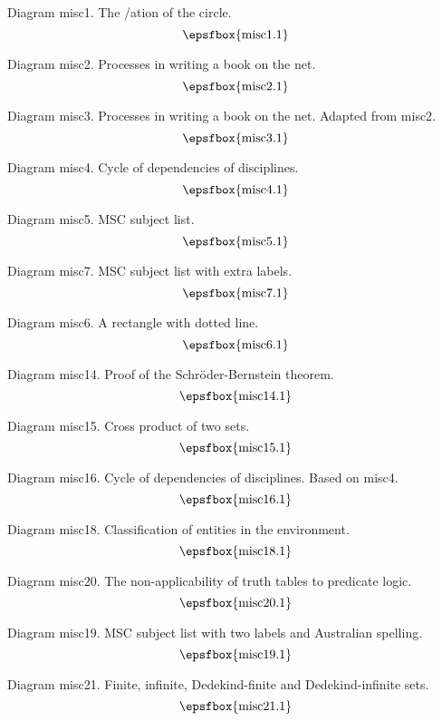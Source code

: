 Diagram misc1. The \parametris/ation of the circle.
$$
\centerline{\epsfbox{misc1.1}}
$$

Diagram misc2. Processes in writing a book on the net.
$$
\centerline{\epsfbox{misc2.1}}
$$

Diagram misc3. Processes in writing a book on the net. Adapted from misc2.
$$
\centerline{\epsfbox{misc3.1}}
$$

Diagram misc4. Cycle of dependencies of disciplines.
$$
\centerline{\epsfbox{misc4.1}}
$$

\filleject

Diagram misc5. MSC subject list.
$$
\centerline{\epsfbox{misc5.1}}
$$

\filleject

Diagram misc7. MSC subject list with extra labels.
$$
\centerline{\epsfbox{misc7.1}}
$$

\filleject

Diagram misc6. A rectangle with dotted line.
$$
\centerline{\epsfbox{misc6.1}}
$$

Diagram misc14. Proof of the Schr\"oder-Bernstein theorem.
$$
\centerline{\epsfbox{misc14.1}}
$$

Diagram misc15. Cross product of two sets.
$$
\centerline{\epsfbox{misc15.1}}
$$

\filleject

Diagram misc16. Cycle of dependencies of disciplines. Based on misc4.
$$
\centerline{\epsfbox{misc16.1}}
$$

Diagram misc18. Classification of entities in the environment.
$$
\centerline{\epsfbox{misc18.1}}
$$

Diagram misc20. The non-applicability of truth tables to predicate logic.
$$
\centerline{\epsfbox{misc20.1}}
$$

\filleject

Diagram misc19. MSC subject list with two labels and Australian
spelling.
$$
\centerline{\epsfbox{misc19.1}}
$$

Diagram misc21. Finite, infinite, Dedekind-finite and Dedekind-infinite sets.
$$
\centerline{\epsfbox{misc21.1}}
$$


